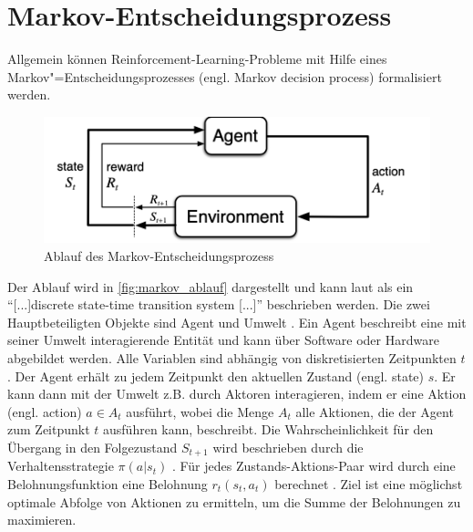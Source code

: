 \section{Markov-Entscheidungsprozess}\label{sec:markov}
Allgemein können Reinforcement-Learning-Probleme mit Hilfe eines Markov"=Entscheidungsprozesses (engl. Markov decision process) \cite[S. 636]{castano} formalisiert werden.

\begin{figure}
    \centering
    \includegraphics[width=1.0\textwidth]{graphics/markov.png}
    \caption{Ablauf des Markov-Entscheidungsprozess}
    \label{fig:markov_ablauf}
\end{figure}

Der Ablauf wird in \autoref{fig:markov_ablauf} dargestellt und kann laut \cite[S. 636]{castano} als ein \enquote{[...]discrete state-time transition system [...]} beschrieben werden. 
Die zwei Hauptbeteiligten Objekte sind Agent und Umwelt \cite[S. 47ff.]{sutton2018}.
Ein Agent beschreibt eine mit seiner Umwelt interagierende Entität und kann über Software oder Hardware abgebildet werden.
Alle Variablen sind abhängig von diskretisierten Zeitpunkten $t$.
Der Agent erhält zu jedem Zeitpunkt den aktuellen Zustand (engl. state) $s$.
Er kann dann mit der Umwelt z.B. durch Aktoren interagieren, indem er eine Aktion (engl. action) $a \in A_t$ ausführt, wobei die Menge $A_t$ alle Aktionen, die der Agent zum Zeitpunkt $t$ ausführen kann, beschreibt.
Die Wahrscheinlichkeit für den Übergang in den Folgezustand $S_{t+1}$ wird beschrieben durch die Verhaltensstrategie $\pi(a|s_t)$ \cite[S. 58]{sutton2018}.
Für jedes Zustands-Aktions-Paar wird durch eine Belohnungsfunktion eine Belohnung $r_t(s_t, a_t)$ berechnet \cite[S. 638]{castano}.
Ziel ist eine möglichst optimale Abfolge von Aktionen zu ermitteln, um die Summe der Belohnungen zu maximieren.
